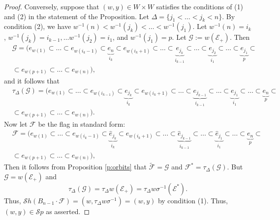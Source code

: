\documentclass[10pt,a4paper]{amsart}
\newcommand{\F}{\mathcal{F}}
\newcommand{\G}{\mathcal{G}}
\newcommand{\Sh}{\mathcal{S}h}
\newcommand{\Sp}{\mathcal{S}p}
\newcommand{\he}{\hat{e}}
\begin{document}
\begin{proof}
Conversely, suppose that $(w,y)\in W\times W$ satisfies the conditions of (1) and (2) in the statement of the Proposition.  
Let $\Delta=\{j_{1}<\dots< j_{k}<n\}$.  By condition (2), we have $w^{-1}(n)<w^{-1}(j_{k})<\dots< w^{-1}(j_{1})$.  
Let $w^{-1}(n)=i_{k}$, $w^{-1}(j_{k})=i_{k-1}, \dots w^{-1}(j_{2})=i_{1}$, and $w^{-1}(j_{1})=p$.  Let $\mathcal{G}:=w(\mathcal{E}_{+})$.  
Then 
\begin{equation*}
\begin{split}
&\mathcal{G}=
(e_{w(1)}\subset\dots\subset e_{w(i_{k}-1)}\subset\underbrace{e_{n}}_{i_{k}}\subset e_{w(i_{k}+1)}\subset \dots\subset \underbrace{e_{j_{k}}}_{i_{k-1}}\subset\dots\subset \underbrace{e_{j_{2}}}_{i_{1}}\subset \dots\subset\underbrace{e_{j_{1}}}_{p}\subset\\
&\subset e_{w(p+1)}\subset\dots\subset e_{w(n)}),
\end{split}
\end{equation*}
and it follows that 
\begin{equation*}
\begin{split}
&\tau_{\Delta} (\mathcal{G})=(e_{w(1)}\subset \dots\subset e_{w(i_{k-1})}\subset \underbrace{e_{j_{k}}}_{i_{k}}\subset e_{w(i_{k}+1)}\subset \dots\subset \underbrace{e_{j_{k-1}}}_{i_{k-1}}\subset \dots\subset \underbrace{e_{j_{1}}}_{i_{1}}\subset \dots\subset\underbrace{e_{n}}_{p}\subset\\ &\subset e_{w(p+1)} 
\subset \dots\subset e_{w(n)}).
\end{split}
\end{equation*}
Now let $\F$ be the flag in standard form:
\begin{equation*}
\begin{split}
&\F=(e_{w(1)}\subset\dots\subset e_{w(i_{k}-1)}\subset\underbrace{ \he_{j_{k}}}_{i_{k}}\subset e_{w(i_{k}+1)}\subset \dots \subset \underbrace{\he_{j_{k-1}}}_{i_{k-1}}\subset \dots \subset \underbrace{\he_{j_{1}}}_{i_{1}}\subset \dots\subset \underbrace{e_{n}}_{p}\subset\\
&\subset e_{w(p+1)}\subset \dots\subset e_{w(n)}),
\end{split}
\end{equation*}
Then it follows from Proposition \ref{p:orbits} that $\tilde{\F}=\mathcal{G}$ and $\F^{*}=\tau_{\Delta}(\G)$.  
But $\G=w(\mathcal{E}_{+})$ and $$\tau_{\Delta}(\G)=\tau_{\Delta}w(\mathcal{E}_{+})=\tau_{\Delta}w\sigma^{-1}(\mathcal{E}^{*}).$$  
Thus, $\Sh(B_{n-1}\cdot \F)=(w, \tau_{\Delta}w\sigma^{-1})=(w,y)$ by condition (1).  
Thus, $(w,y)\in \Sp$ as asserted. 
\end{proof}
\end{document}
